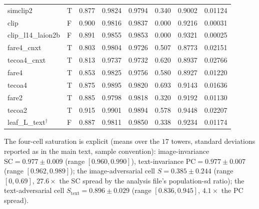 \begin{table}[t]
\begin{tabular}{llccccc r}
simclip2          & T & 0.877 & 0.9824 & 0.9794 & 0.340 & 0.9002 & 0.01124 \\
clip              & F & 0.900 & 0.9816 & 0.9837 & 0.000 & 0.9216 & 0.00031 \\
clip\_l14\_laion2b& F & 0.891 & 0.9855 & 0.9853 & 0.000 & 0.9321 & 0.00025 \\
fare4\_cnxt       & T & 0.803 & 0.9804 & 0.9726 & 0.507 & 0.8773 & 0.02151 \\
tecoa4\_cnxt      & T & 0.813 & 0.9737 & 0.9732 & 0.620 & 0.8937 & 0.02766 \\
fare4             & T & 0.853 & 0.9825 & 0.9756 & 0.580 & 0.8927 & 0.01220 \\
tecoa4            & T & 0.875 & 0.9895 & 0.9820 & 0.693 & 0.9143 & 0.01636 \\
fare2             & T & 0.885 & 0.9798 & 0.9818 & 0.320 & 0.9192 & 0.01130 \\
tecoa2            & T & 0.915 & 0.9901 & 0.9894 & 0.578 & 0.9448 & 0.02207 \\
leaf\_L\_text$^\dagger$ & F & 0.887 & 0.9811 & 0.9850 & 0.338 & 0.9234 & 0.01174 \\
\bottomrule
\end{tabular}
\end{table}

The four-cell saturation is explicit (means over the $17$ towers, standard
deviations reported as in the main text, sample convention): image-invariance
$\mathrm{SC}=0.977\pm0.009$ (range $[0.960,0.990]$), text-invariance
$\mathrm{PC}=0.977\pm0.007$ (range $[0.962,0.989]$); the image-adversarial cell
$S=0.385\pm0.244$ (range $[0,0.69]$, $27.6\times$ the SC spread by the analysis
file's population-sd ratio); the text-adversarial cell
$S_{\text{text}}=0.896\pm0.029$ (range $[0.836,0.945]$, $4.1\times$ the PC
spread).

